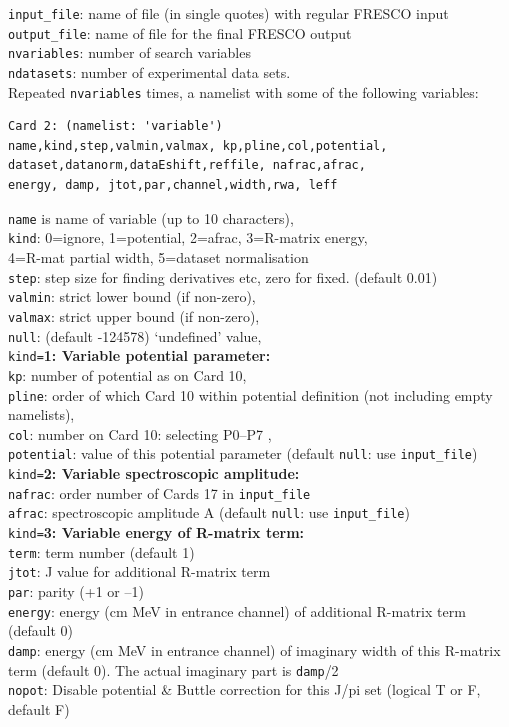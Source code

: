 \documentclass[11pt]{article}
\begin{document}
{\tt input\_file}: name of file (in single quotes) with regular FRESCO input\\
{\tt output\_file}: name of file for the final FRESCO output\\
{\tt nvariables}: number of search variables\\
{\tt ndatasets}:  number of experimental data sets.\\

Repeated {\tt nvariables} times, a namelist with some of the following variables:
\begin{verbatim}
Card 2: (namelist: 'variable')
name,kind,step,valmin,valmax, kp,pline,col,potential,
dataset,datanorm,dataEshift,reffile, nafrac,afrac,
energy, damp, jtot,par,channel,width,rwa, leff
\end{verbatim}
{\tt name} is name of variable (up to 10 characters),\\
{\tt kind}: 0=ignore, 1=potential, 2=afrac, 3=R-matrix energy,\\
   \hspace*{10mm} 4=R-mat partial width, 5=dataset normalisation\\
{\tt step}: step size for finding derivatives etc, zero for fixed. (default 0.01)\\
{\tt valmin}: strict lower bound (if non-zero),\\
{\tt valmax}: strict upper bound (if non-zero), \\
{\tt null}: (default -124578) `undefined' value,\\

{\tt kind=}{\bf 1: Variable potential parameter:}\\
{\tt kp}: number of potential as on Card 10,\\
{\tt pline}: order of which Card 10 within potential definition (not including empty namelists),\\
{\tt col}:   number on Card 10: selecting P0--P7 ,\\
{\tt potential}: value of this potential parameter (default {\tt null}: use {\tt input\_file})\\

{\tt kind=}{\bf 2: Variable spectroscopic amplitude:}\\
{\tt nafrac}: order number of Cards 17 in {\tt input\_file}\\
{\tt afrac}: spectroscopic amplitude A (default {\tt null}: use {\tt input\_file})\\

{\tt kind=}{\bf 3: Variable energy of R-matrix term:}\\
{\tt term}: term number (default 1)\\
{\tt jtot}: J value for additional R-matrix term\\
{\tt par}: parity (+1 or --1)\\
{\tt energy}: energy (cm MeV in entrance channel) of additional R-matrix term (default 0)\\
{\tt damp}: energy (cm MeV in entrance channel) of imaginary width of this R-matrix term (default 0). The actual  imaginary part is {\tt damp}/2\\
{\tt nopot}: Disable potential \& Buttle correction for this J/pi set (logical T or F, default F)\\
\end{document}
